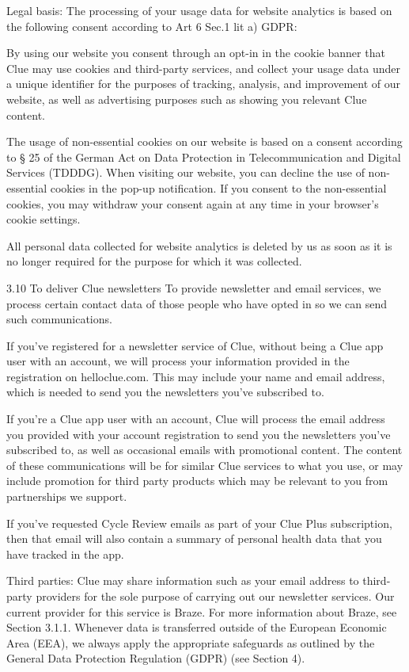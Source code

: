 Legal basis: The processing of your usage data for website analytics is based on the following consent according to Art 6 Sec.1 lit a) GDPR:

By using our website you consent through an opt-in in the cookie banner that Clue may use cookies and third-party services, and collect your usage data under a unique identifier for the purposes of tracking, analysis, and improvement of our website, as well as advertising purposes such as showing you relevant Clue content.

The usage of non-essential cookies on our website is based on a consent according to § 25 of the German Act on Data Protection in Telecommunication and Digital Services (TDDDG). When visiting our website, you can decline the use of non-essential cookies in the pop-up notification. If you consent to the non-essential cookies, you may withdraw your consent again at any time in your browser’s cookie settings.

All personal data collected for website analytics is deleted by us as soon as it is no longer required for the purpose for which it was collected.

3.10 To deliver Clue newsletters
To provide newsletter and email services, we process certain contact data of those people who have opted in so we can send such communications.

If you’ve registered for a newsletter service of Clue, without being a Clue app user with an account, we will process your information provided in the registration on helloclue.com. This may include your name and email address, which is needed to send you the newsletters you’ve subscribed to.

If you’re a Clue app user with an account, Clue will process the email address you provided with your account registration to send you the newsletters you’ve subscribed to, as well as occasional emails with promotional content. The content of these communications will be for similar Clue services to what you use, or may include promotion for third party products which may be relevant to you from partnerships we support.

If you’ve requested Cycle Review emails as part of your Clue Plus subscription, then that email will also contain a summary of personal health data that you have tracked in the app.

Third parties: Clue may share information such as your email address to third-party providers for the sole purpose of carrying out our newsletter services. Our current provider for this service is Braze. For more information about Braze, see Section 3.1.1. Whenever data is transferred outside of the European Economic Area (EEA), we always apply the appropriate safeguards as outlined by the General Data Protection Regulation (GDPR) (see Section 4).

